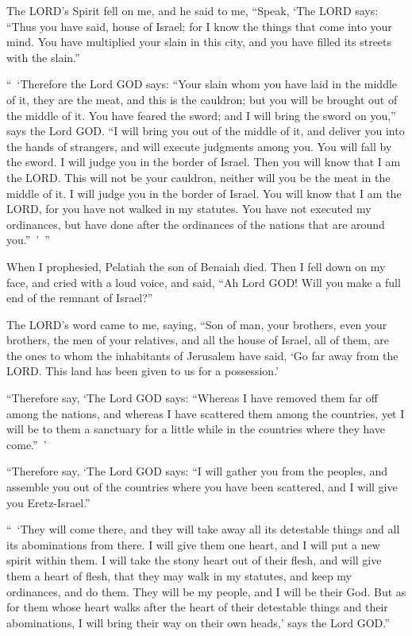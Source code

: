 \myverse{}The LORD’s Spirit fell on me, and he said to me, “Speak, ‘The
LORD says: “Thus you have said, house of Israel; for I know the things that come into your mind.
\myverse{}You have multiplied your slain in this city, and you have filled its streets
with the slain.”

\myverse{}“ ‘Therefore the Lord GOD says: “Your slain whom you have laid
in the middle of it, they are the meat, and this is the cauldron; but you will be brought out of the middle
of it.
\myverse{}You have feared the sword; and I will bring the sword on you,” says the Lord
GOD.
\myverse{}“I will bring you out of the middle of it, and deliver you into the hands of
strangers, and will execute judgments among you.
\myverse{}You will fall by the sword. I will judge you in the border of Israel. Then
you will know that I am the LORD.
\myverse{}This will not be your cauldron, neither will you be the meat in the middle
of it. I will judge you in the border of Israel.
\myverse{}You will know that I am the LORD, for you have not walked in my statutes.
You have not executed my ordinances, but have done after the ordinances of the nations that are around
you.” ’ ”

\myverse{}When I prophesied, Pelatiah the son of Benaiah died. Then I
fell down on my face, and cried with a loud voice, and said, “Ah Lord GOD! Will you make a full end of
the remnant of Israel?”

\myverse{}The LORD’s word came to me, saying,
\myverse{}“Son of man, your brothers, even your brothers, the men of your relatives,
and all the house of Israel, all of them, are the ones to whom the inhabitants of Jerusalem have said,
‘Go far away from the LORD. This land has been given to us for a possession.’

\myverse{}“Therefore say, ‘The Lord GOD says: “Whereas I have removed
them far off among the nations, and whereas I have scattered them among the countries, yet I will be to
them a sanctuary for a little while in the countries where they have come.” ’

\myverse{}“Therefore say, ‘The Lord GOD says: “I will gather you from
the peoples, and assemble you out of the countries where you have been scattered, and I will give you
Eretz-Israel.”

\myverse{}“ ‘They will come there, and they will take away all its detestable
things and all its abominations from there.
\myverse{}I will give them one heart, and I will put a new spirit within them. I will
take the stony heart out of their flesh, and will give them a heart of flesh,
\myverse{}that they may walk in my statutes, and keep my ordinances, and do them. They
will be my people, and I will be their God.
\myverse{}But as for them whose heart walks after the heart of their detestable things
and their abominations, I will bring their way on their own heads,’ says the Lord GOD.”

